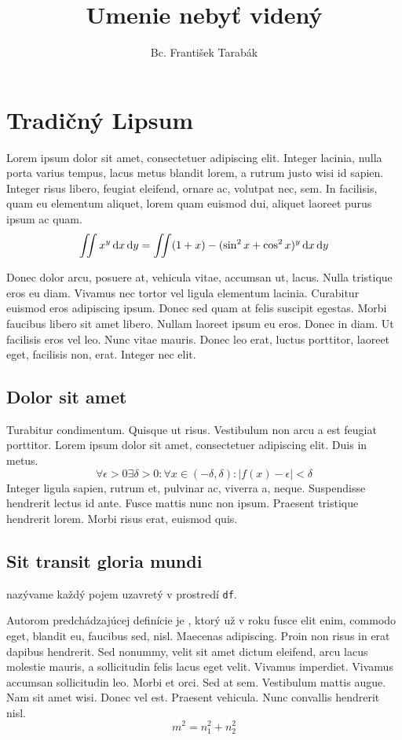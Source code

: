 \documentclass[thesismargins, thesislinespacing, twoside, draft, upjsfrontpage]{rnthesis}
\title{Umenie nebyť videný}
\author{Bc. František Tarabák}
\begin{document}
\maketitle
\newpage
\tableofcontents
\newpage
\chapter{Tradičný Lipsum}

Lorem ipsum dolor sit amet, consectetuer adipiscing elit.
Integer lacinia, nulla porta varius tempus, lacus metus blandit
lorem, a rutrum justo wisi id sapien. Integer risus libero,
feugiat eleifend, ornare ac, volutpat nec, sem. In facilisis,
quam eu elementum aliquet, lorem quam euismod dui, aliquet
laoreet purus ipsum ac quam. 
%
$$\int\!\!\!\int x^y\,{\rm d}x\,{\rm d}y = \int\!\!\!\int (1 + x) - (\sin^2 x + \cos^2 x)^y\,{\rm d}x\,{\rm d}y$$

Donec dolor arcu, posuere at, vehicula vitae, accumsan ut,
lacus. Nulla tristique eros eu diam. Vivamus nec tortor vel
ligula elementum lacinia. Curabitur euismod eros adipiscing
ipsum. Donec sed quam at felis suscipit egestas. Morbi faucibus
libero sit amet libero. Nullam laoreet ipsum eu eros. Donec in
diam. Ut facilisis eros vel leo. Nunc vitae mauris. Donec leo
erat, luctus porttitor, laoreet eget, facilisis non, erat.
Integer nec elit.

\section{Dolor sit amet}

Turabitur condimentum. Quisque ut risus. Vestibulum non arcu a
est feugiat porttitor. Lorem ipsum dolor sit amet, consectetuer
adipiscing elit. Duis in metus. 
%
$$\forall \epsilon>0 \exists \delta>0:\forall x\in(-\delta,\delta):|f(x)-\epsilon|<\delta$$
%
Integer ligula sapien, rutrum et, pulvinar ac, viverra a,
neque. Suspendisse hendrerit lectus id ante. Fusce mattis nunc
non ipsum. Praesent tristique hendrerit lorem. Morbi risus
erat, euismod quis.

\section{Sit transit gloria mundi}
\begin{df}
 nazývame každý pojem uzavretý v prostredí 
\texttt{df}.
\end{df}

Autorom predchádzajúcej definície je ,
ktorý už v roku fusce elit enim, commodo eget, blandit eu,
faucibus sed, nisl. Maecenas adipiscing. Proin non risus in
erat dapibus hendrerit. Sed nonummy, velit sit amet dictum
eleifend, arcu lacus molestie mauris, a sollicitudin felis
lacus eget velit. Vivamus imperdiet. Vivamus accumsan
sollicitudin leo. Morbi et orci. Sed at sem. Vestibulum mattis
augue. Nam sit amet wisi. Donec vel est. Praesent vehicula.
Nunc convallis hendrerit nisl.
%
$$m^2=n_1^2+n_2^2$$
\end{document}
